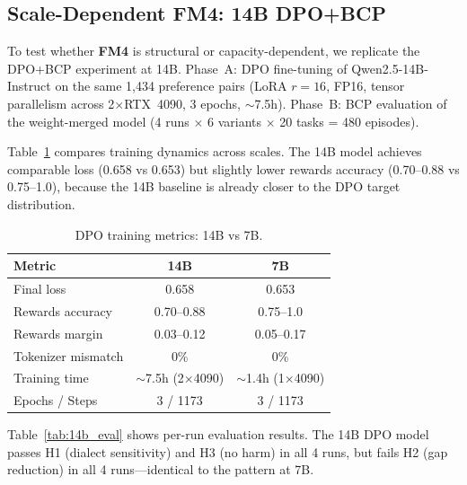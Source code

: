 \documentclass[11pt,a4paper]{article}
\newcommand{\fm}[1]{\textbf{FM#1}}
\begin{document}
\subsection{Scale-Dependent FM4: 14B DPO+BCP}
\label{sec:14b_dpo}

To test whether \fm{4} is structural or capacity-dependent, we replicate the DPO+BCP experiment at 14B.
Phase~A: DPO fine-tuning of Qwen2.5-14B-Instruct on the same 1,434 preference pairs (LoRA $r{=}16$, FP16, tensor parallelism across 2$\times$RTX~4090, 3 epochs, $\sim$7.5h).
Phase~B: BCP evaluation of the weight-merged model (4 runs $\times$ 6 variants $\times$ 20 tasks = 480 episodes).

Table~\ref{tab:14b_training} compares training dynamics across scales.
The 14B model achieves comparable loss (0.658 vs 0.653) but slightly lower rewards accuracy (0.70--0.88 vs 0.75--1.0), because the 14B baseline is already closer to the DPO target distribution.

\begin{table}[t]
\centering
\caption{DPO training metrics: 14B vs 7B.}
\label{tab:14b_training}
\small
\begin{tabular}{lcc}
\toprule
\textbf{Metric} & \textbf{14B} & \textbf{7B} \\
\midrule
Final loss & 0.658 & 0.653 \\
Rewards accuracy & 0.70--0.88 & 0.75--1.0 \\
Rewards margin & 0.03--0.12 & 0.05--0.17 \\
Tokenizer mismatch & 0\% & 0\% \\
Training time & $\sim$7.5h (2$\times$4090) & $\sim$1.4h (1$\times$4090) \\
Epochs / Steps & 3 / 1173 & 3 / 1173 \\
\bottomrule
\end{tabular}
\end{table}

Table~\ref{tab:14b_eval} shows per-run evaluation results.
The 14B DPO model passes H1 (dialect sensitivity) and H3 (no harm) in all 4 runs, but fails H2 (gap reduction) in all 4 runs---identical to the pattern at 7B.
\end{document}
